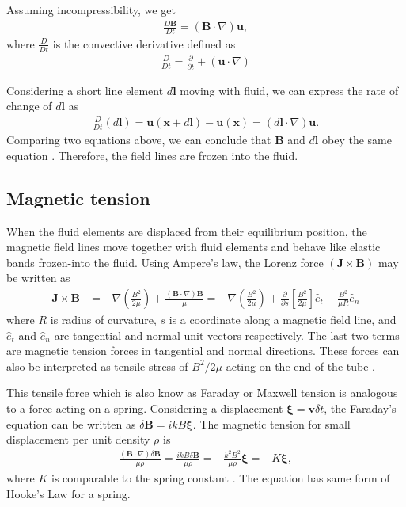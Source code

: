 \documentclass{jfm}
\newcommand{\del}{\nabla}
\begin{document}
Assuming incompressibility, we get
\begin{align}
    \frac{D \mathbf{B}}{D t} = (\mathbf{B}\cdot \del) \mathbf{u},
\end{align}
where $\frac{D}{Dt}$ is the convective derivative defined as
\begin{align}
    \frac{D}{Dt} = \frac{\partial}{\partial t} + (\mathbf{u} \cdot \del)
\end{align}

Considering a short line element $d\mathbf{l}$ moving with fluid, we can express 
the rate of change of $d\mathbf{l}$ as
\begin{align}
    \frac{D}{Dt}\left(d\mathbf{l}\right) = \mathbf{u}(\mathbf{x}+d\mathbf{l})-\mathbf{u}(\mathbf{x})=(d\mathbf{l}\cdot\del)\mathbf{u}.
\end{align}
Comparing two equations above, we can conclude that $\mathbf{B}$ and 
$d\mathbf{l}$ obey the same equation \citep{Davidson2001}. Therefore, the 
field lines are frozen into the fluid.


%
%
\subsection{Magnetic tension}

When the fluid elements are displaced from their equilibrium position, the 
magnetic field lines move together with fluid elements and behave like elastic
bands frozen-into the fluid. Using Ampere's law, the Lorenz force 
$(\mathbf{J}\times\mathbf{B})$ may be written as
\begin{align}
    \mathbf{J}\times\mathbf{B} &= - \del\left(\frac{B^2}{2\mu}\right) +\frac{(\mathbf{B}\cdot \del)\mathbf{B}}{\mu}
    =- \del\left(\frac{B^2}{2\mu}\right)+\frac{\partial}{\partial s} \left[\frac{B^2}{2\mu}\right]\hat{e}_t - \frac{B^2}{\mu R}\hat{e}_n
\end{align} 
where $R$ is radius of curvature, $s$ is a coordinate along a magnetic field
line, and $\hat{e}_t$ and $\hat{e}_n$ are tangential and normal unit vectors
respectively. The last two terms are magnetic tension forces in tangential and
normal directions. These forces can also be interpreted as tensile stress of
$B^2/2\mu$ acting on the end of the tube \citep{Davidson2001}. 

This tensile force which is also know as Faraday or Maxwell tension is
analogous to a force acting on a spring. Considering a displacement
$\boldsymbol{\xi}=\mathbf{v}\delta t$, the Faraday's equation can be written as
$\delta \mathbf{B} = ikB\boldsymbol{\xi}$. The magnetic tension for small
displacement per unit density $\rho$ is
\begin{align}
    \frac{(\mathbf{B}\cdot\del)\delta \mathbf{B}}{\mu \rho}=\frac{ikB\delta \mathbf{B}}{\mu \rho} = -\frac{k^2 B^2}{\mu\rho} \boldsymbol{\xi} = -K \boldsymbol{\xi},
\end{align}
where $K$ is comparable to the spring constant \citep{Balbus1998}.
The equation has same form of Hooke's Law for a spring.
\end{document}
